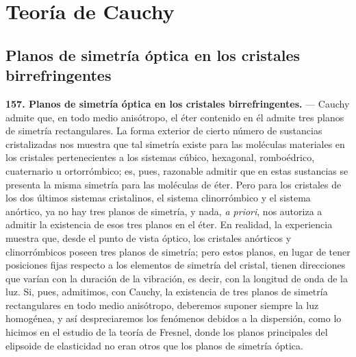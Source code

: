 \section{Teoría de Cauchy}

\subsection{Planos de simetría óptica en los cristales birrefringentes}

\noindent\textbf{157. Planos de simetría óptica en los cristales
birrefringentes.} — Cauchy admite que, en todo medio anisótropo, el éter
contenido en él admite tres planos de simetría rectangulares. La forma
exterior de cierto número de sustancias cristalizadas nos muestra que tal
simetría existe para las moléculas materiales en los cristales
pertenecientes a los sistemas cúbico, hexagonal, romboédrico, cuaternario
u ortorrómbico; es, pues, razonable admitir que en estas sustancias se
presenta la misma simetría para las moléculas de éter. Pero para los
cristales de los dos últimos sistemas cristalinos, el sistema
clinorrómbico y el sistema anórtico, ya no hay tres planos de simetría, y
nada, \emph{a priori}, nos autoriza a admitir la existencia de esos tres
planos en el éter. En realidad, la experiencia muestra que, desde el punto
de vista óptico, los cristales anórticos y clinorrómbicos poseen tres
planos de simetría; pero estos planos, en lugar de tener posiciones fijas
respecto a los elementos de simetría del cristal, tienen direcciones que
varían con la duración de la vibración, es decir, con la longitud de onda
de la luz. Si, pues, admitimos, con Cauchy, la existencia de tres planos
de simetría rectangulares en todo medio anisótropo, deberemos suponer
siempre la luz homogénea, y así despreciaremos los fenómenos debidos a la
dispersión, como lo hicimos en el estudio de la teoría de Fresnel, donde
los planos principales del elipsoide de elasticidad no eran otros que los
planos de simetría óptica.

